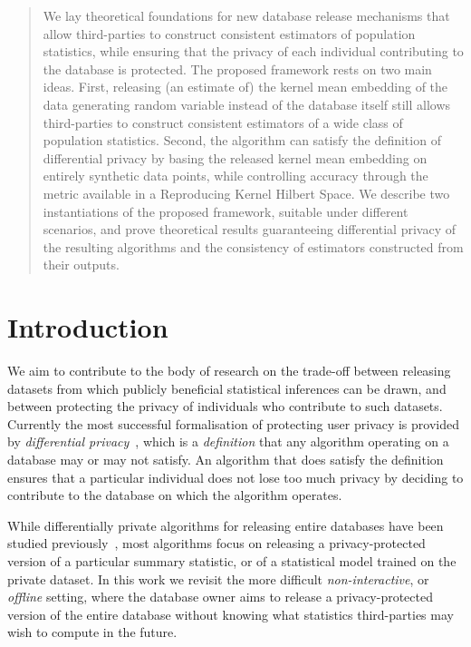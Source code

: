 \documentclass{article}
\theoremstyle{plain}
\theoremstyle{remark}
\theoremstyle{definition}
\begin{document}
\begin{abstract}
We lay theoretical foundations for new database release mechanisms that allow third-parties to construct consistent estimators of population statistics, while ensuring that the privacy of each individual contributing to the database is protected. The proposed framework rests on two main ideas. First, releasing (an estimate of) the kernel mean embedding of the data generating random variable instead of the database itself still allows third-parties to construct consistent estimators of a wide class of population statistics. Second, the algorithm can satisfy the definition of differential privacy by basing the released kernel mean embedding on entirely synthetic data points, while controlling accuracy through the metric available in a Reproducing Kernel Hilbert Space. We describe two instantiations of the proposed framework, suitable under different scenarios, and prove theoretical results guaranteeing differential privacy of the resulting algorithms and the consistency of estimators constructed from their outputs.
\end{abstract}



\section{Introduction}
\label{sec:introduction}

We aim to contribute to the body of research on the trade-off between releasing datasets from which publicly beneficial statistical inferences can be drawn, and between protecting the privacy of individuals who contribute to such datasets. Currently the most successful formalisation of protecting user privacy is provided by \emph{differential privacy}~\cite{dwork_algorithmic_2014}, which is a \emph{definition} that any algorithm operating on a database may or may not satisfy. An algorithm that does satisfy the definition ensures that a particular individual does not lose too much privacy by deciding to contribute to the database on which the algorithm operates.

While differentially private algorithms for releasing entire databases have been studied previously~\cite{blum_learning_2008,wasserman_statistical_2008,zhou_differential_2009}, most algorithms focus on releasing a privacy-protected version of a particular summary statistic, or of a statistical model trained on the private dataset. In this work we revisit the more difficult \emph{non-interactive}, or \emph{offline} setting, where the database owner aims to release a privacy-protected version of the entire database without knowing what statistics third-parties may wish to compute in the future.
\end{document}
